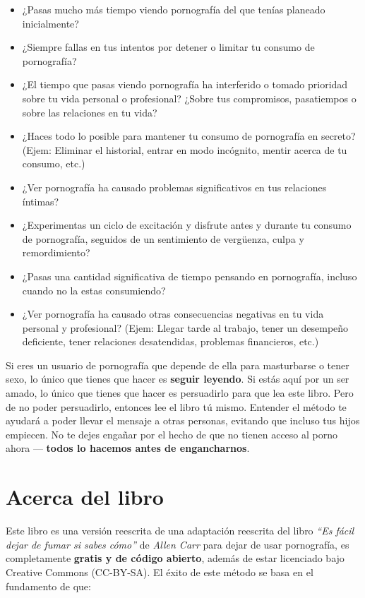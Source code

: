 \documentclass[
]{book}
\providecommand{\tightlist}{%
  \setlength{\itemsep}{0pt}\setlength{\parskip}{0pt}}
\begin{document}
\begin{itemize}
\tightlist
\item
  ¿Pasas mucho más tiempo viendo pornografía del que tenías planeado inicialmente?
\item
  ¿Siempre fallas en tus intentos por detener o limitar tu consumo de pornografía?
\item
  ¿El tiempo que pasas viendo pornografía ha interferido o tomado prioridad sobre tu vida personal o profesional? ¿Sobre tus compromisos, pasatiempos o sobre las relaciones en tu vida?
\item
  ¿Haces todo lo posible para mantener tu consumo de pornografía en secreto? (Ejem: Eliminar el historial, entrar en modo incógnito, mentir acerca de tu consumo, etc.)
\item
  ¿Ver pornografía ha causado problemas significativos en tus relaciones íntimas?
\item
  ¿Experimentas un ciclo de excitación y disfrute antes y durante tu consumo de pornografía, seguidos de un sentimiento de vergüenza, culpa y remordimiento?
\item
  ¿Pasas una cantidad significativa de tiempo pensando en pornografía, incluso cuando no la estas consumiendo?
\item
  ¿Ver pornografía ha causado otras consecuencias negativas en tu vida personal y profesional? (Ejem: Llegar tarde al trabajo, tener un desempeño deficiente, tener relaciones desatendidas, problemas financieros, etc.)
\end{itemize}

Si eres un usuario de pornografía que depende de ella para masturbarse o tener sexo, lo único que tienes que hacer es \textbf{seguir leyendo}. Si estás aquí por un ser amado, lo único que tienes que hacer es persuadirlo para que lea este libro. Pero de no poder persuadirlo, entonces lee el libro tú mismo. Entender el método te ayudará a poder llevar el mensaje a otras personas, evitando que incluso tus hijos empiecen. No te dejes engañar por el hecho de que no tienen acceso al porno ahora --- \textbf{todos lo hacemos antes de engancharnos}.

\hypertarget{acerca-del-libro}{%
\section*{Acerca del libro}\label{acerca-del-libro}}

Este libro es una versión reescrita de una adaptación reescrita del libro \emph{``Es fácil dejar de fumar si sabes cómo''} de \emph{Allen Carr} para dejar de usar pornografía, es completamente \textbf{gratis y de código abierto}, además de estar licenciado bajo Creative Commons (CC-BY-SA). El éxito de este método se basa en el fundamento de que:
\end{document}
